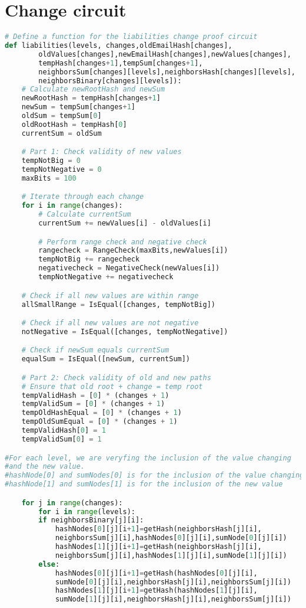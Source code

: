 \section{Change circuit}
\label{subsec:plcc}
\begin{lstlisting}[language=Python, caption=Liabilities change circuit pseudocode]
# Define a function for the liabilities change proof circuit
def liabilities(levels, changes,oldEmailHash[changes],
        oldValues[changes],newEmailHash[changes],newValues[changes],
        tempHash[changes+1],tempSum[changes+1],
        neighborsSum[changes][levels],neighborsHash[changes][levels],
        neighborsBinary[changes][levels]):         
    # Calculate newRootHash and newSum
    newRootHash = tempHash[changes+1]
    newSum = tempSum[changes+1]
    oldSum = tempSum[0]
    oldRootHash = tempHash[0]
    currentSum = oldSum

    # Part 1: Check validity of new values
    tempNotBig = 0
    tempNotNegative = 0
    maxBits = 100

    # Iterate through each change
    for i in range(changes):
        # Calculate currentSum
        currentSum += newValues[i] - oldValues[i]

        # Perform range check and negative check
        rangecheck = RangeCheck(maxBits,newValues[i])
        tempNotBig += rangecheck
        negativecheck = NegativeCheck(newValues[i])
        tempNotNegative += negativecheck

    # Check if all new values are within range
    allSmallRange = IsEqual([changes, tempNotBig])

    # Check if all new values are not negative
    notNegative = IsEqual([changes, tempNotNegative])

    # Check if newSum equals currentSum
    equalSum = IsEqual([newSum, currentSum])

    # Part 2: Check validity of old and new paths
    # Ensure that old root + change = temp root
    tempValidHash = [0] * (changes + 1)
    tempValidSum = [0] * (changes + 1)
    tempOldHashEqual = [0] * (changes + 1)
    tempOldSumEqual = [0] * (changes + 1)
    tempValidHash[0] = 1
    tempValidSum[0] = 1

#For each level, we are veryfing the inclusion of the value changing
#and the new value.
#hashNode[0] and sumNodes[0] is for the inclusion of the value changing
#hashNode[1] and sumNodes[1] is for the inclusion of the new value

    for j in range(changes):
        for i in range(levels):
        if neighborsBinary[j][i]:
            hashNodes[0][j][i+1]=getHash(neighborsHash[j][i],
            neighborsSum[j][i],hashNodes[0][j][i],sumNode[0][j][i])
            hashNodes[1][j][i+1]=getHash(neighborsHash[j][i],
            neighborsSum[j][i],hashNodes[1][j][i],sumNode[1][j][i])
        else:
            hashNodes[0][j][i+1]=getHash(hashNodes[0][j][i],
            sumNode[0][j][i],neighborsHash[j][i],neighborsSum[j][i])
            hashNodes[1][j][i+1]=getHash(hashNodes[1][j][i],
            sumNode[1][j][i],neighborsHash[j][i],neighborsSum[j][i])


\end{lstlisting}
